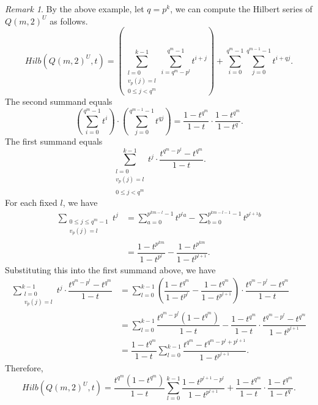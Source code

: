 \documentclass[12pt,a4paper]{report}
\theoremstyle{definition}
\theoremstyle{remark}
\newtheorem*{remark}{Remark}
\theoremstyle{definition}
\begin{document}
\begin{remark}
    By the above example, let $q=p^k$, we can compute the Hilbert series of $Q(m, 2)^{U}$ as follows.
    \begin{equation*}
    Hilb(Q(m, 2)^{U}, t)=\left(\sum\limits_{\substack{l=0\\ v_p(j) = l\\0\leq j<q^m}}^{k-1}\sum\limits_{i = q^m - p^l}^{q^m-1}t^{i+j}\right) + \sum\limits_{i=0}^{q^m-1}\sum\limits_{j=0}^{q^{m-1}-1}t^{i+qj}.
\end{equation*} 
The second summand equals
\begin{equation*}
    \left(\sum\limits_{i=0}^{q^m-1}t^i\right)\cdot \left(\sum\limits_{j=0}^{q^{m-1}-1}t^{qj}\right)=\dfrac{1-t^{q^m}}{1-t}\cdot \dfrac{1-t^{q^m}}{1-t^q}.
\end{equation*}
The first summand equals
\begin{equation*}
    \sum\limits_{\substack{l=0\\ v_p(j) = l\\\\0\leq j<q^m}}^{k-1}t^j\cdot \dfrac{t^{q^m-p^l}-t^{q^m}}{1-t}.
\end{equation*}
For each fixed $l$, we have
\begin{align*}
    \sum\limits_{\substack{0\leq j\leq q^m-1\\ v_p(j) = l}}t^j &= \sum\limits_{a = 0}^{p^{km-l}-1}t^{p^l a} - \sum\limits_{b = 0}^{p^{km-l-1}-1}t^{p^{l+1} b}\\
    &=\dfrac{1-t^{p^{km}}}{1-t^{p^l}} - \dfrac{1 - t^{p^{km}}}{1-t^{p^{l+1}}}.
\end{align*}
Substituting this into the first summand above, we have
\begin{align*}
    \sum\limits_{\substack{l=0\\ v_p(j) = l}}^{k-1}t^j\cdot \dfrac{t^{q^m-p^l}-t^{q^m}}{1-t} & =\sum\limits_{l=0}^{k-1}\left(\dfrac{1-t^{q^{m}}}{1-t^{p^l}} - \dfrac{1 - t^{q^{m}}}{1-t^{p^{l+1}}}\right)\cdot \dfrac{t^{q^m-p^l}-t^{q^m}}{1-t}\\
    &=\sum\limits_{l=0}^{k-1}\dfrac{t^{q^m-p^l}(1-t^{q^m})}{1-t}-\dfrac{1-t^{q^m}}{1-t}\cdot \dfrac{t^{q^m-p^l}-t^{q^m}}{1-t^{p^{l+1}}}\\
    &=\dfrac{1-t^{q^m}}{1-t}\sum\limits_{l=0}^{k-1}\dfrac{t^{q^m}-t^{q^m-p^l + p^{l+1}}}{1-t^{p^{l+1}}}.
\end{align*}
Therefore,
\begin{equation*}
    Hilb(Q(m, 2)^{U}, t) = \dfrac{t^{q^m}(1-t^{q^m})}{1-t}\sum\limits_{l=0}^{k-1}\dfrac{1-t^{p^{l+1}-p^l}}{1-t^{p^{l+1}}}+\dfrac{1-t^{q^m}}{1-t}\cdot \dfrac{1-t^{q^m}}{1-t^q}.

\end{equation*}
\end{remark}
\end{document}
